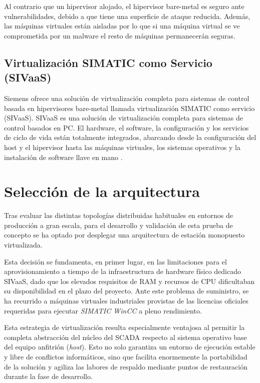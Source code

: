 Al contrario que un hipervisor alojado, el hipervisor bare-metal es seguro ante vulnerabilidades, debido a que tiene una superficie de ataque reducida. Además, las máquinas virtuales están aisladas por lo que si una máquina virtual se ve comprometida por un malware el resto de máquinas permanecerán seguras.\par

\subsection{Virtualización SIMATIC como Servicio (\ac{SIVaaS})}
Siemens ofrece una solución de virtualización completa para sistemas de control basada en hipervisores bare-metal llamada virtualización SIMATIC como servicio (\ac{SIVaaS}). \ac{SIVaaS} es una solución de virtualización completa para sistemas de control basados en PC. El hardware, el software, la configuración y los servicios de ciclo de vida están totalmente integrados, abarcando desde la configuración del host y el hipervisor hasta las máquinas virtuales, los sistemas operativos y la instalación de software llave en mano \cite{siemens_sivaas_2025}.  \par

\section{Selección de la arquitectura}

Tras evaluar las distintas topologías distribuidas habituales en entornos de producción a gran escala, para el desarrollo y validación de esta prueba de concepto se ha optado por desplegar una arquitectura de estación monopuesto virtualizada.\par

Esta decisión se fundamenta, en primer lugar, en las limitaciones para el aprovisionamiento a tiempo de la infraestructura de hardware físico dedicado \ac{SIVaaS}, dado que los elevados requisitos de \ac{RAM} y recursos de \ac{CPU}  dificultaban su disponibilidad en el plazo del proyecto. Ante este problema de suministro, se ha recurrido a máquinas virtuales industriales provistas de las licencias oficiales requeridas para ejecutar \textit{SIMATIC WinCC} a pleno rendimiento.\par 

Esta estrategia de virtualización resulta especialmente ventajosa al permitir la completa abstracción del núcleo del \ac{SCADA} respecto al sistema operativo base del equipo anfitrión (\textit{host}). Esto no solo garantiza un entorno de ejecución estable y libre de conflictos informáticos, sino que facilita enormemente la portabilidad de la solución y agiliza las labores de respaldo mediante puntos de restauración durante la fase de desarrollo.

